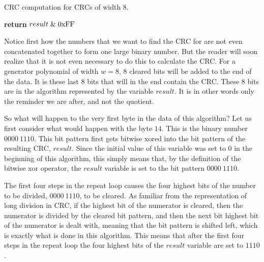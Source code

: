 \begin{algorithm}[H]
  \caption{CRC computation for CRCs of width 8.}
  \label{alg:crc8-comp}
  \begin{algorithmic}[1]


    \Else
    \EndIf
    \EndRepeatn

    \EndForEach

    \State \textbf{return}  $result \mathrel{\&} \mathrm{0xFF}$
    \EndProcedure

  \end{algorithmic}
\end{algorithm}

Notice first how the numbers that we want to find the CRC for are not
even concatenated together to form one large binary number.  But the
reader will soon realize that it is not even necessary to do this to
calculate the CRC.  For a generator polynomial of width $w=8$, $8$
cleared bits will be added to the end of the data. It is these last
$8$ bits that will in the end contain the CRC. These 8 bits are in the
algorithm represented by the variable $result$. It is in other words
only the reminder we are after, and not the quotient.

So what will happen to the very first byte in the data of this
algorithm? Let us first consider what would happen with the byte
$14$. This is the binary number $0000\ 1110$. This bit pattern first
gets bitwise xored into the bit pattern of the resulting CRC,
$result$. Since the initial value of this variable was set to $0$ in
the beginning of this algorithm, this simply means that, by the
definition of the bitwise xor operator, the $result$ variable is set
to the bit pattern $0000\ 1110$.

The first four steps in the repeat loop causes the four highest bits
of the number to be divided, $0000\ 1110$, to be cleared. As familiar
from the representation of long division in CRC, if the highest bit of
the numerator is cleared, then the numerator is divided by the cleared
bit pattern, and then the next bit highest bit of the numerator is
dealt with, meaning that the bit pattern is shifted left, which is
exactly what is done in this algorithm. This means that after the
first four steps in the repeat loop the four highest bits of the
$result$ variable are set to $1110$.

